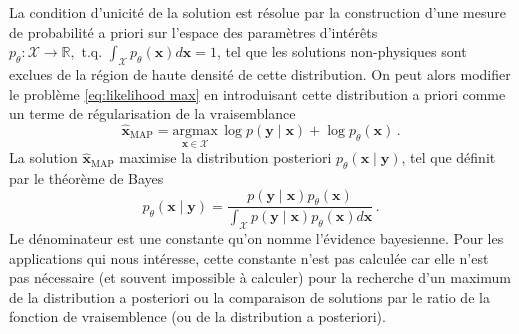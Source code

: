 

La condition d'unicité de la solution est résolue par la construction d'une
mesure de probabilité a priori sur l'espace des paramètres d'intérêts 
$p_\theta: \mathcal{X} \rightarrow \mathbb{R}, \,\, \mathrm{t.q.}\,\, \int_{\mathcal{X}} p_\theta(\mathbf{x}) d\mathbf{x} = 1$,
tel que les solutions non-physiques sont exclues de la région de haute densité de cette distribution.
On peut alors modifier le problème \eqref{eq:likelihood max} en introduisant cette distribution 
a priori comme un terme de régularisation de la vraisemblance
\begin{equation}\label{eq:MAP intro}
        \hat{\mathbf{x}}_{\mathrm{MAP}} = \underset{\mathbf{x} \in \mathcal{X}}{\mathrm{argmax}}\, \log p(\mathbf{y} \mid \mathbf{x}) + \log p_\theta(\mathbf{x})\, .
\end{equation} 
La solution $\hat{\mathbf{x}}_{\mathrm{MAP}}$ maximise la distribution posteriori $p_\theta(\mathbf{x} \mid \mathbf{y})$, 
tel que définit par le théorème de Bayes
\begin{equation}\label{eq:Bayes}
        p_\theta(\mathbf{x} \mid \mathbf{y}) = \frac{p(\mathbf{y} \mid \mathbf{x}) p_\theta(\mathbf{x})}{\int_{\mathcal{X}} p(\mathbf{\mathbf{y}} \mid \mathbf{x}) p_\theta(\mathbf{x}) d\mathbf{x}}\, .
\end{equation} 
Le dénominateur est une constante qu'on nomme l'évidence bayesienne. 
Pour les applications qui nous intéresse, cette constante n'est pas calculée 
car elle n'est pas nécessaire (et souvent impossible à calculer) 
pour la recherche d'un maximum de la distribution a posteriori ou 
la comparaison de solutions par le ratio de la fonction de vraisemblence (ou de la distribution a posteriori).

